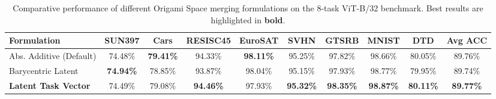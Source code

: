\begin{table}[t]
\caption{Comparative performance of different Origami Space merging formulations on the 8-task ViT-B/32 benchmark. Best results are highlighted in \textbf{bold}.}
\label{tab:scale_preserving_results}
\vskip 0.15in
\begin{center}
\begin{small}
\begin{sc}
\setlength{\tabcolsep}{4.5pt}
\begin{tabular}{lccccccccc}
\toprule
Formulation & SUN397 & Cars & RESISC45 & EuroSAT & SVHN & GTSRB & MNIST & DTD & Avg ACC \\
\midrule
Abs. Additive (Default) & 74.48\% & \textbf{79.41\%} & 94.33\% & \textbf{98.11\%} & 95.25\% & 97.82\% & 98.66\% & 80.05\% & 89.76\% \\
Barycentric Latent & \textbf{74.94\%} & 78.85\% & 93.87\% & 98.04\% & 95.15\% & 97.93\% & 98.77\% & 79.95\% & 89.74\% \\
\textbf{Latent Task Vector} & 74.49\% & 79.08\% & \textbf{94.46\%} & 97.93\% & \textbf{95.32\%} & \textbf{98.35\%} & \textbf{98.87\%} & \textbf{80.11\%} & \textbf{89.77\%} \\
\bottomrule
\end{tabular}
\end{sc}
\end{small}
\end{center}
\vskip -0.1in
\end{table}
